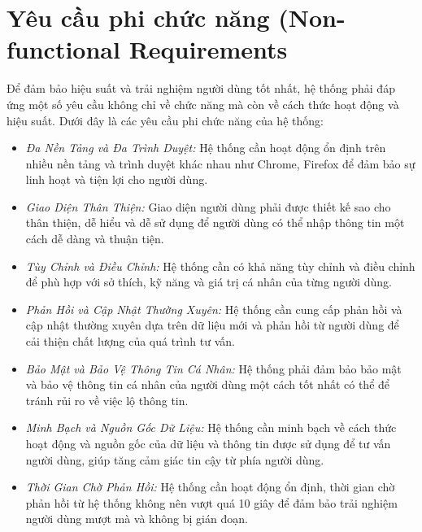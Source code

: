 \section{Yêu cầu phi chức năng (Non-functional Requirements}

Để đảm bảo hiệu suất và trải nghiệm người dùng tốt nhất, hệ thống phải đáp ứng một số yêu cầu không chỉ về chức năng mà còn về cách thức hoạt động và hiệu suất. Dưới đây là các yêu cầu phi chức năng của hệ thống:
\begin{itemize}
    \item \textit{Đa Nền Tảng và Đa Trình Duyệt:} Hệ thống cần hoạt động ổn định trên nhiều nền tảng và trình duyệt khác nhau như Chrome, Firefox để đảm bảo sự linh hoạt và tiện lợi cho người dùng.
    \item \textit{Giao Diện Thân Thiện:} Giao diện người dùng phải được thiết kế sao cho thân thiện, dễ hiểu và dễ sử dụng để người dùng có thể nhập thông tin một cách dễ dàng và thuận tiện.
    \item \textit{Tùy Chỉnh và Điều Chỉnh:} Hệ thống cần có khả năng tùy chỉnh và điều chỉnh để phù hợp với sở thích, kỹ năng và giá trị cá nhân của từng người dùng.
    \item \textit{Phản Hồi và Cập Nhật Thường Xuyên:} Hệ thống cần cung cấp phản hồi và cập nhật thường xuyên dựa trên dữ liệu mới và phản hồi từ người dùng để cải thiện chất lượng của quá trình tư vấn.
    \item \textit{Bảo Mật và Bảo Vệ Thông Tin Cá Nhân:} Hệ thống phải đảm bảo bảo mật và bảo vệ thông tin cá nhân của người dùng một cách tốt nhất có thể để tránh rủi ro về việc lộ thông tin.
    \item \textit{Minh Bạch và Nguồn Gốc Dữ Liệu:} Hệ thống cần minh bạch về cách thức hoạt động và nguồn gốc của dữ liệu và thông tin được sử dụng để tư vấn người dùng, giúp tăng cảm giác tin cậy từ phía người dùng.
    \item \textit{Thời Gian Chờ Phản Hồi:} Hệ thống cần hoạt động ổn định, thời gian chờ phản hồi từ hệ thống không nên vượt quá 10 giây để đảm bảo trải nghiệm người dùng mượt mà và không bị gián đoạn.
\end{itemize}
